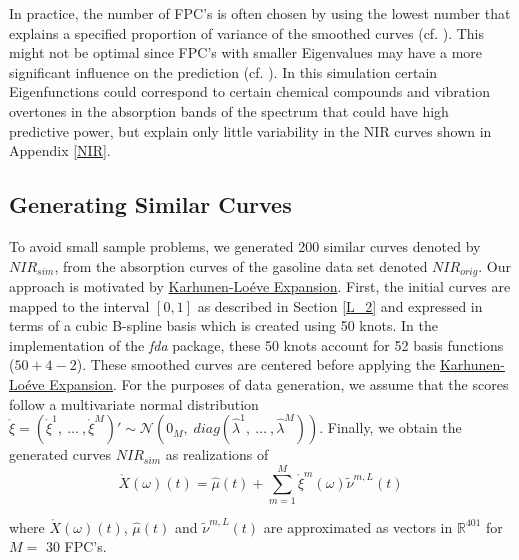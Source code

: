 \documentclass[11pt,twoside,a4paper]{article}
\begin{document}
	In practice, the number of FPC's is often chosen by using the lowest number that explains a specified proportion of variance of the smoothed curves (cf. \cite{kokoszka_introduction_2017}). This might not be optimal since FPC's with smaller Eigenvalues may have a more significant influence on the prediction (cf. \cite{Jolliffe_1982}). In this simulation certain Eigenfunctions could correspond to certain chemical compounds and vibration overtones in the absorption bands of the spectrum that could have high predictive power, but explain only little variability in the NIR curves shown in Appendix \ref{NIR}.
	
	\subsection{Generating Similar Curves}\label{similar_curves}
	
	To avoid small sample problems, we generated 200 similar curves denoted by $NIR_{sim}$, from the absorption curves of the gasoline data set denoted $NIR_{orig}$. Our approach is motivated by \hyperlink{KL}{Karhunen-Lo\'{e}ve Expansion}. First, the initial curves are mapped to the interval $[0,1]$ as described in Section \ref{L_2} and expressed in terms of a cubic B-spline basis which is created using 50 knots. In the implementation of the \textit{fda} package, these 50 knots account for 52 basis functions ($50+4-2$). These smoothed curves are centered before applying the \hyperlink{KL}{Karhunen-Lo\'{e}ve Expansion}. For the purposes of data generation, we assume that the scores follow a multivariate normal distribution $\mathring{\xi} = \left(\mathring{\xi}^{1},\: \dots \:, \mathring{\xi}^{M}\right)' \sim \mathcal{N}(0_M, \; diag(\hat{\lambda}^1,\: \dots\:, \hat{\lambda}^M))$. Finally, we obtain the generated curves $NIR_{sim}$ as realizations of
	\begin{equation}
		\mathring{X}(\omega)(t) = \hat{\mu}(t) + \sum_{m = 1}^{M} \mathring{\xi}^m(\omega) \tilde{\nu}^{m,L}(t)
	\end{equation}
	
	where $\mathring{X}(\omega)(t)$, $\hat{\mu}(t)$ and $\tilde{\nu}^{m,L}(t)$  are approximated as vectors in $\mathbb{R}^{401}$ for $M =$ 30 FPC's.
    
\end{document}
